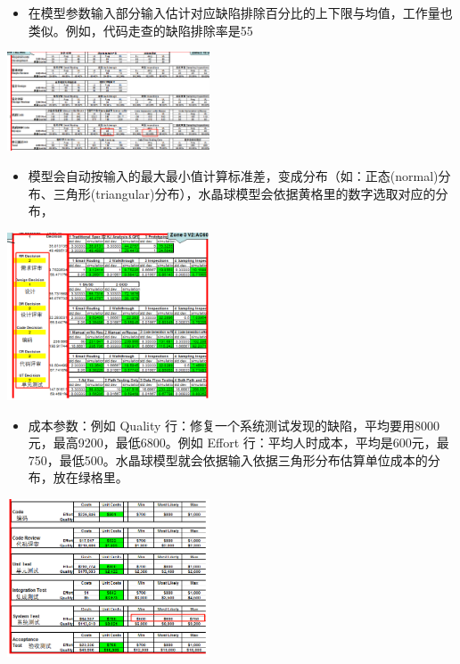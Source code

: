 \begin{itemize}
\tightlist
\item
  在模型参数输入部分输入估计对应缺陷排除百分比的上下限与均值，工作量也类似。例如，代码走查的缺陷排除率是55%
\end{itemize}


\includegraphics[width=6cm]{微信截图_20211027011246.png}

\begin{itemize}
\tightlist
\item
  模型会自动按输入的最大最小值计算标准差，变成分布（如：正态(normal)分布、三角形(triangular)分布），水晶球模型会依据黄格里的数字选取对应的分布，
\end{itemize}


\includegraphics[width=6cm]{微信截图_20231027140307.png}

\begin{itemize}
\tightlist
\item
  成本参数：例如 Quality 行：修复一个系统测试发现的缺陷，平均要用8000元，最高9200，最低6800。例如 Effort 行：平均人时成本，平均是600元，最750，最低500。水晶球模型就会依据输入依据三角形分布估算单位成本的分布，放在绿格里。
\end{itemize}


\includegraphics[width=6cm]{微信截图_20231027140341.png}

